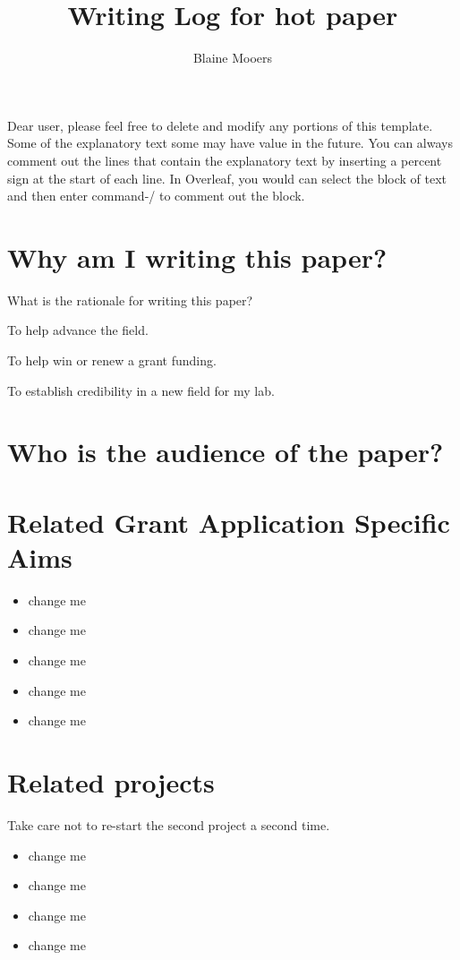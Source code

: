 \documentclass[10pt,letterpaper]{article}
\title{Writing Log for hot paper}
\author{Blaine Mooers}
\begin{document}
\maketitle

\tableofcontents

Dear user, please feel free to delete and modify any portions of this template.
Some of the explanatory text some may have value in the future.
You can always comment out the lines that contain the explanatory text by inserting a percent sign at the start of each line.
In Overleaf, you would can select the block of text and then enter command-/ to comment out the block.


\section{Why am I writing this paper?}

What is the rationale for writing this paper?

To help advance the field.

To help win or renew a grant funding.

To establish credibility in a new field for my lab.

\section{Who is the audience of the paper?}

\section{Related Grant Application Specific Aims}

\begin{itemize}
\item change me
\item change me
\item change me
\item change me
\item change me
\end{itemize}

\section{Related projects}

Take care not to re-start the second project a second time.

\begin{itemize}
  \item change me
  \item change me
  \item change me
  \item change me
\end{itemize}
\end{document}

